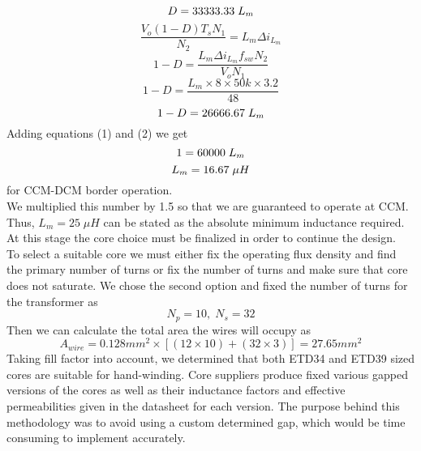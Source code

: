 \begin{equation} \bigskip \\
    D = 33333.33 \; L_m
\end{equation}
\begin{equation*}
    \frac{V_o (1-D) T_s N_1}{N_2} = L_m \Delta i_{L_m}
\end{equation*}
\begin{equation*}
    1-D = \frac{L_m \Delta i_{L_m} f_{sw} N_2}{V_o N_1}
\end{equation*}
\begin{equation*}
    1-D = \frac{L_m \times 8 \times 50k \times 3.2}{48}
\end{equation*}
\begin{equation} \medskip \\
    1-D = 26666.67 \; L_m
\end{equation}
Adding equations (1) and (2) we get
\begin{equation*} \medskip \\
    1 = 60000 \; L_m
\end{equation*}
\begin{equation*} \medskip \\
    L_m = 16.67 \; \mu H
\end{equation*}
for CCM-DCM border operation. \\
We multiplied this number by 1.5 so that we are guaranteed to operate at CCM. Thus, $L_m = 25 \; \mu H$ can be stated as the absolute minimum inductance required. At this stage the core choice must be finalized in order to continue the design. \\
To select a suitable core we must either fix the operating flux density and find the primary number of turns or fix the number of turns and make sure that core does not saturate. We chose the second option and fixed the number of turns for the transformer as
\begin{equation*}
    N_p = 10, \; N_s = 32
\end{equation*}
Then we can calculate the total area the wires will occupy as
\begin{equation*}
    A_{wire} =  0.128 mm^2 \times [(12\times10)+(32\times3)] = 27.65 mm^2
\end{equation*}
Taking fill factor into account, we determined that both ETD34 and ETD39 sized cores are suitable for hand-winding. Core suppliers produce fixed various gapped versions of the cores as well as their inductance factors and effective permeabilities given in the datasheet for each version. The purpose behind this methodology was to avoid using a custom determined gap, which would be time consuming to implement accurately.\\
